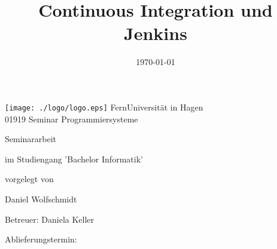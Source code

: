 \documentclass[german,11pt,a4paper]{report} %
\begin{document}
\begin{huge}
\begin{center}
       \texttt{[image: ./logo/logo.eps]} FernUniversität in Hagen\\
				01919 Seminar Programmiersysteme
    \end{center}
\end{huge}

\vspace{3cm}


\title{Continuous Integration und Jenkins}
\date{\vspace{-5ex}}
{\let\newpage\relax\maketitle}
\thispagestyle{empty}


\begin{center}
\begin{large}
\begin{Large}
Seminararbeit\\
\end{Large}
im Studiengang 'Bachelor Informatik' \\
\end{large}
\end{center}
\begin{center}
vorgelegt von\\
\begin{large}
Daniel Wolfschmidt\\
\end{large}
\end{center}
\vspace{1cm}
\begin{center}
\begin{large}
Betreuer: Daniela Keller\\
\end{large}
\end{center}

\begin{center}
\begin{large}
Ablieferungstermin: \date{\today} \\
\end{large}
\end{center}
\end{document}
